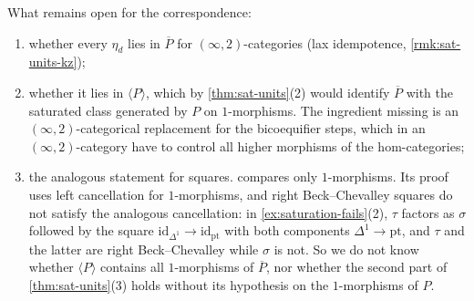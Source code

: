 \begin{rmk}
\label{rmk:sat-open}
%
What remains open for the correspondence:
\begin{enumerate}
\item whether every $\eta_{d}$ lies in $\overline{P}$ for
$(\infty,2)$-categories (lax idempotence, \cref{rmk:sat-units-kz});
\item whether it lies in $\langle P \rangle$,
which by \cref{thm:sat-units}(2) would identify $\overline{P}$ with the
saturated class generated by $P$ on $1$-morphisms.
The ingredient missing is an $(\infty,2)$-categorical replacement for the
bicoequifier steps, which in an $(\infty,2)$-category have to control all higher
morphisms of the hom-categories;
\item the analogous statement for squares.
 compares only $1$-morphisms.
Its proof uses left cancellation for $1$-morphisms,
and right Beck--Chevalley squares do not satisfy the analogous cancellation:
in \cref{ex:saturation-fails}(2), $\tau$ factors as $\sigma$ followed by the
square
$\mathrm{id}_{\Delta^{1}} \to \mathrm{id}_{\mathrm{pt}}$
with both components
$\Delta^{1} \to \mathrm{pt}$,
and $\tau$ and the latter are right Beck--Chevalley while $\sigma$ is not.
So we do not know whether $\langle P \rangle$ contains all $1$-morphisms of
$\overline{P}$, nor whether the second part of \cref{thm:sat-units}(3) holds
without its hypothesis on the $1$-morphisms of $P$.
\end{enumerate}
\end{rmk}

